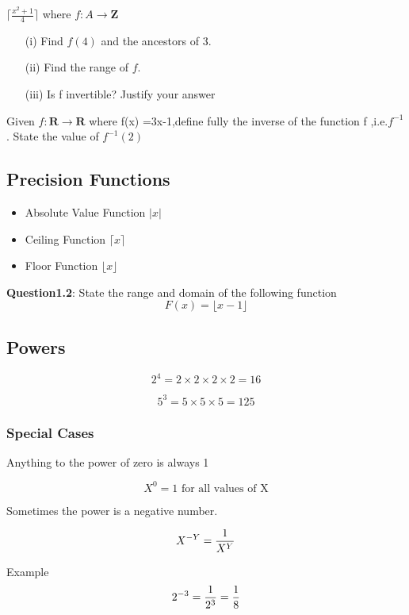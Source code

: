 \documentclass[]{report}
\begin{document}
$\lceil \frac{x^2+1}{4} \rceil$
where $f : A \rightarrow \textbf{Z}$
\begin{itemize}
	\item[(i)] Find $f(4)$ and the ancestors of 3.
	\item[(ii)] Find the range of $f$.
	\item[(iii)] Is f invertible? Justify your answer
\end{itemize}

Given $f : \textbf{R} \rightarrow \textbf{R}$ where f(x) =3x-1,define fully
the inverse of the function f ,i.e.$f^{-1}$. 
State the value of $f^{-1}(2)$
\subsection{Precision Functions}

\begin{itemize}
	\item Absolute Value Function $| x |$
	\item Ceiling Function $\lceil x \rceil$
	\item Floor Function  $\lfloor x \rfloor $
\end{itemize}

\noindent \textbf{Question1.2}: State the range and domain of the following function
\[ F(x) = \lfloor x-1 \rfloor \]
\subsection{Powers}

\[  2^ 4 = 2 \times 2 \times 2 \times 2 = 16 \]

\[  5^ 3 = 5 \times 5 \times 5 =125 \]

\subsubsection{Special Cases}

Anything to the power of zero is always 1

\[  X^ 0 = 1 \mbox{ for all values of X} \]

Sometimes the power is a negative number.

\[  X^{-Y} = { 1 \over X^Y}  \]

Example 
\[  2^{-3} = { 1 \over 2^3} = { 1 \over 8}  \]
\end{document}
